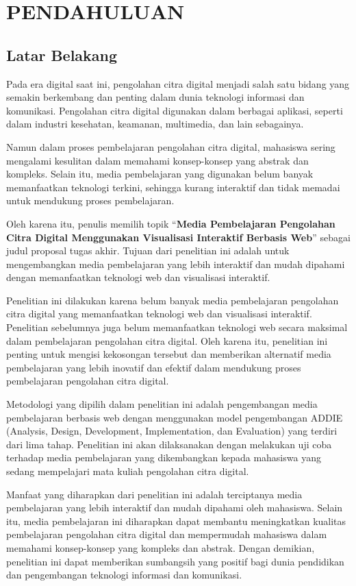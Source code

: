 \chapter{PENDAHULUAN}

\section{Latar Belakang}
Pada era digital saat ini, pengolahan citra digital menjadi salah satu bidang yang semakin berkembang dan penting dalam dunia teknologi informasi dan komunikasi. Pengolahan citra digital digunakan dalam berbagai aplikasi, seperti dalam industri kesehatan, keamanan, multimedia, dan lain sebagainya.

Namun dalam proses pembelajaran pengolahan citra digital, mahasiswa sering mengalami kesulitan dalam memahami konsep-konsep yang abstrak dan kompleks. Selain itu, media pembelajaran yang digunakan belum banyak memanfaatkan teknologi terkini, sehingga kurang interaktif dan tidak memadai untuk mendukung proses pembelajaran.

Oleh karena itu, penulis memilih topik ``\textbf{Media Pembelajaran Pengolahan Citra Digital Menggunakan Visualisasi Interaktif Berbasis Web}'' sebagai judul proposal tugas akhir. Tujuan dari penelitian ini adalah untuk mengembangkan media pembelajaran yang lebih interaktif dan mudah dipahami dengan memanfaatkan teknologi web dan visualisasi interaktif.

Penelitian ini dilakukan karena belum banyak media pembelajaran pengolahan citra digital yang memanfaatkan teknologi web dan visualisasi interaktif. Penelitian sebelumnya juga belum memanfaatkan teknologi web secara maksimal dalam pembelajaran pengolahan citra digital. Oleh karena itu, penelitian ini penting untuk mengisi kekosongan tersebut dan memberikan alternatif media pembelajaran yang lebih inovatif dan efektif dalam mendukung proses pembelajaran pengolahan citra digital.

Metodologi yang dipilih dalam penelitian ini adalah pengembangan media pembelajaran berbasis web dengan menggunakan model pengembangan ADDIE (Analysis, Design, Development, Implementation, dan Evaluation) yang terdiri dari lima tahap. Penelitian ini akan dilaksanakan dengan melakukan uji coba terhadap media pembelajaran yang dikembangkan kepada mahasiswa yang sedang mempelajari mata kuliah pengolahan citra digital.

Manfaat yang diharapkan dari penelitian ini adalah terciptanya media pembelajaran yang lebih interaktif dan mudah dipahami oleh mahasiswa. Selain itu, media pembelajaran ini diharapkan dapat membantu meningkatkan kualitas pembelajaran pengolahan citra digital dan mempermudah mahasiswa dalam memahami konsep-konsep yang kompleks dan abstrak. Dengan demikian, penelitian ini dapat memberikan sumbangsih yang positif bagi dunia pendidikan dan pengembangan teknologi informasi dan komunikasi.

